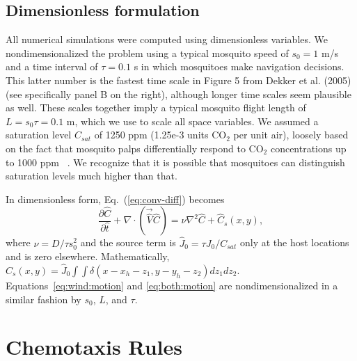 \documentclass[12pt]{article}
\newif\ifcommentsw
\newcommand{\comment}[1]{\ifcommentsw  $\blacktriangleright$\ \textbf{#1}\ $\blacktriangleleft$ \fi}
\begin{document}
\comment{slight reformatting in the above two equations MH}

\subsection{Dimensionless  formulation}
All numerical simulations were computed using dimensionless variables.
We nondimensionalized  the problem using a typical
mosquito speed of $s_0 = 1$ m/s~\cite{Clements1999} and a time
interval of $\tau = 0.1$ s in which mosquitoes make navigation
decisions. This latter number is the fastest time scale in
Figure 5 from Dekker et al. (2005) (see specifically panel B on
the right), although longer time scales seem plausible as well.
These scales together imply a typical mosquito flight length of
$L = s_0 \tau = 0.1$ m, which we use to scale all space
variables. We assumed a saturation level $C_{sat}$ of 1250 ppm (1.25e-3 units CO$_2$ per unit air), loosely based on the fact that mosquito palps differentially respond to CO$_2$ concentrations up to 1000 ppm ~\cite{Grant1995}. We recognize that it is possible that mosquitoes can distinguish saturation levels much higher than that.




In dimensionless form,
Eq.~(\ref{eq:conv-diff}) becomes
\begin{equation}\label{eq:conv-diff2}
\frac{\partial \hat{C}}{\partial \hat{t}} + \nabla\cdot ( \vec{\hat{V}} \hat{C} ) = \nu\nabla^2 \hat{C} + \hat{C}_s(x,y),
\end{equation}
where $\nu = D/\tau s_0^2$ and the source term is
$\hat{J}_0 =\tau J_0/C_{sat}$ only at the host locations and is zero elsewhere.
Mathematically, $\hat{C}_s(x,y) = \hat{J}_0 \int\!\!\!\int \delta(x-x_h-z_1,y-y_h-z_2) dz_1 dz_2$.
Equations~\eqref{eq:wind:motion} and \eqref{eq:both:motion} are nondimensionalized in a similar fashion by $s_0$, $L$, and $\tau$.



\section{Chemotaxis Rules}\label{sec:chemostats}
	
\end{document}
